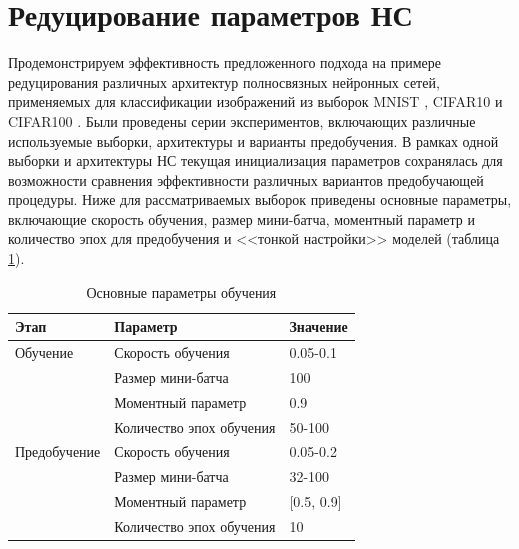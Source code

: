 

\section{Редуцирование параметров НС}


Продемонстрируем эффективность предложенного подхода на примере редуцирования различных архитектур полносвязных нейронных сетей, применяемых для классификации изображений из выборок MNIST \cite{mnist}, CIFAR10 и CIFAR100 \cite[c.~3]{krizhevsky2009learning}.
Были проведены серии экспериментов, включающих различные используемые выборки, архитектуры и варианты предобучения. В рамках одной выборки и архитектуры НС текущая инициализация параметров сохранялась для возможности сравнения эффективности различных вариантов предобучающей процедуры.
Ниже для рассматриваемых выборок приведены основные параметры, включающие скорость обучения, размер мини-батча, моментный параметр и количество эпох для предобучения и <<тонкой настройки>> моделей (таблица \ref{table:reduce_training_params}).

\begin{table} [!h]
  \small
  \caption{Основные параметры обучения}\label{table:reduce_training_params}
\centering
\begin{tabular}{| p{3cm} | p{6cm} | p{2cm} |}
  \hline
    \textbf{Этап} & \textbf{Параметр} & \textbf{Значение}\\
    \hline
    Обучение & Скорость обучения & 0.05-0.1\\
    \cline{2-3}
    & Размер мини-батча & 100 \\
    \cline{2-3}
    & Моментный параметр & 0.9 \\
    \cline{2-3}
    & Количество эпох обучения & 50-100\\
    \hline
    Предобучение & Скорость обучения & 0.05-0.2\\
    \cline{2-3}
    & Размер мини-батча & 32-100 \\
    \cline{2-3}
    & Моментный параметр & [0.5, 0.9] \\
    \cline{2-3}
    & Количество эпох обучения & 10\\
    \hline
\end{tabular}
\end{table}

